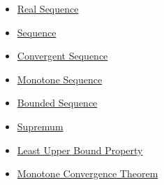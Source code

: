 \begin{dependencies}
\begin{itemize}
  \item \hyperref[def:real-sequence]{Real Sequence}
  \item \hyperref[def:sequence]{Sequence}
  \item \hyperref[def:convergent-sequence]{Convergent Sequence}
  \item \hyperref[def:monotone-sequence]{Monotone Sequence}
  \item \hyperref[def:bounded-sequence]{Bounded Sequence}
  \item \hyperref[def:supremum]{Supremum}
  \item \hyperref[def:least-upper-bound-property]{Least Upper Bound Property}
  \item \hyperref[thm:monotone-convergence-theorem]{Monotone Convergence Theorem}
\end{itemize}
\end{dependencies}

